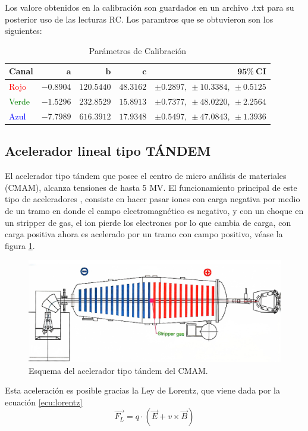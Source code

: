 \documentclass[onecolumn,12pt]{article} %
\begin{document}
Los valore obtenidos en la calibración son guardados en un archivo .txt para su posterior uso de las lecturas RC. Los paramtros que se obtuvieron son los siguientes:

\begin{table}[H]
  \centering
  \label{tab:calibracion}
  \begin{tabular}{lrrrr}
    \hline
    \textbf{Canal} & \(\boldsymbol{a}\) & \(\boldsymbol{b}\) & \(\boldsymbol{c}\) & \(\mathbf{95\%\ CI}\) \\
    \hline
    \textcolor{red}{Rojo}   & \(-0.8904\)     & \(120.5440\)   & \(48.3162\)   & \(\pm0.2897,\ \pm10.3384,\ \pm0.5125\) \\
    \textcolor{green}{Verde}& \(-1.5296\)     & \(232.8529\)   & \(15.8913\)   & \(\pm0.7377,\ \pm48.0220,\ \pm2.2564\) \\
    \textcolor{blue}{Azul}  & \(-7.7989\)     & \(616.3912\)   & \(17.9348\)   & \(\pm0.5497,\ \pm47.0843,\ \pm1.3936\) \\
    \hline
  \end{tabular}
  \caption{Parámetros de Calibración}
\end{table}

\subsection{Acelerador lineal tipo TÁNDEM}
El acelerador tipo tándem que posee el centro de micro análisis de materiales (CMAM), alcanza tensiones de hasta 5 MV. 
El funcionamiento principal de este tipo de aceleradores , consiste en  hacer pasar iones con carga negativa por medio de un tramo en donde el campo electromagnético  es negativo, y con un choque en un stripper de gas, el ion pierde los  electrones  por lo que cambia de carga, con carga positiva  ahora es acelerado por un tramo con campo positivo, véase la figura \ref{fig:tandem}.
\begin{figure}[H]
    \centering   
    \includegraphics[width=0.6\linewidth]{img_intro/TipoTandem.pdf}
    \caption{Esquema del acelerador tipo tándem del CMAM.}
    \label{fig:tandem}
\end{figure}
Esta aceleración es posible gracias  la Ley de Lorentz, que viene dada por la ecuación \ref{ecu:lorentz}
\begin{equation}
   \vec{F_L} = q \cdot (\vec{E}+v\times\vec{B})
   \label{ecu:lorentz}
\end{equation}
\end{document}
